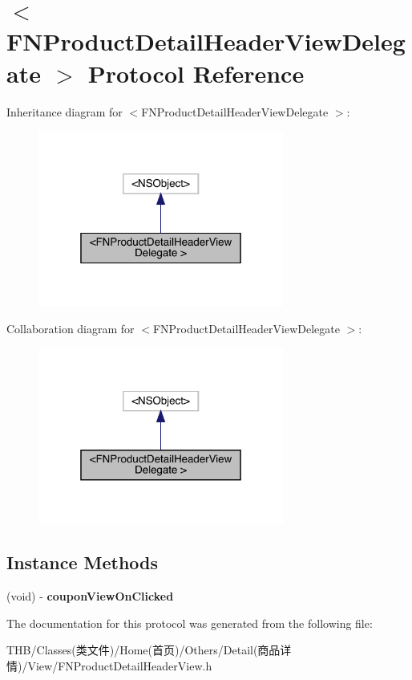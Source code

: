 \hypertarget{protocol_f_n_product_detail_header_view_delegate_01-p}{}\section{$<$F\+N\+Product\+Detail\+Header\+View\+Delegate $>$ Protocol Reference}
\label{protocol_f_n_product_detail_header_view_delegate_01-p}


Inheritance diagram for $<$F\+N\+Product\+Detail\+Header\+View\+Delegate $>$\+:\nopagebreak
\begin{figure}[H]
\begin{center}
\leavevmode
\includegraphics[width=229pt]{protocol_f_n_product_detail_header_view_delegate_01-p__inherit__graph}
\end{center}
\end{figure}


Collaboration diagram for $<$F\+N\+Product\+Detail\+Header\+View\+Delegate $>$\+:\nopagebreak
\begin{figure}[H]
\begin{center}
\leavevmode
\includegraphics[width=229pt]{protocol_f_n_product_detail_header_view_delegate_01-p__coll__graph}
\end{center}
\end{figure}
\subsection*{Instance Methods}
\begin{DoxyCompactItemize}
\item 
\mbox{\label{protocol_f_n_product_detail_header_view_delegate_01-p_a4e4108d8ace9c640bfdeb9a8cacb2082}} 
(void) -\/ {\bfseries coupon\+View\+On\+Clicked}
\end{DoxyCompactItemize}


The documentation for this protocol was generated from the following file\+:\begin{DoxyCompactItemize}
\item 
T\+H\+B/\+Classes(类文件)/\+Home(首页)/\+Others/\+Detail(商品详情)/\+View/F\+N\+Product\+Detail\+Header\+View.\+h\end{DoxyCompactItemize}
